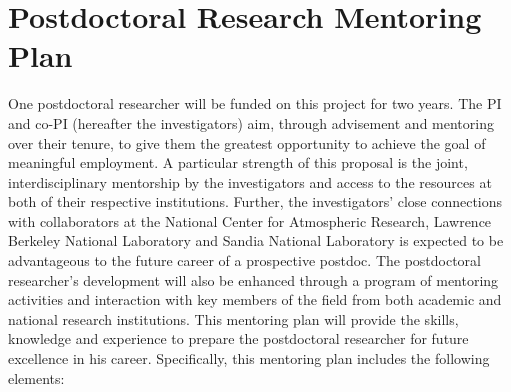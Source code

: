 \documentclass[11pt]{article}
\begin{document}
\thispagestyle{empty}

\appendix

\setcounter{section}{9}

\section{Postdoctoral Research Mentoring Plan}

One postdoctoral researcher will be funded on this project for two years.  The PI and co-PI (hereafter the investigators) aim, through advisement and mentoring over their tenure, to give them the greatest opportunity to achieve the goal of meaningful employment.  A particular strength of this proposal is the joint, interdisciplinary mentorship by the investigators and access to the resources at both of their respective institutions.  Further, the investigators' close connections with collaborators at the National Center for Atmospheric Research, Lawrence Berkeley National Laboratory and Sandia National Laboratory is expected to be advantageous to the future career of a prospective postdoc.  The postdoctoral researcher's development will also be enhanced through a program of mentoring activities and interaction with key members of the field from both academic and national research institutions.  This mentoring plan will provide the skills, knowledge and experience to prepare the postdoctoral researcher for future excellence in his career.  Specifically, this mentoring plan includes the following elements:
\end{document}
